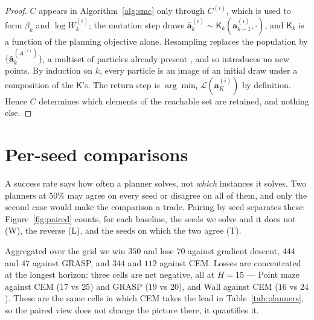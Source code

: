 \begin{proof}
$C$ appears in Algorithm~\ref{alg:smc} only through $C^{(i)}$, which is used to
form $\beta_k$ and $\log W_k^{(i)}$; the mutation step draws
$\bar{\mathbf{a}}_k^{(i)}\sim\mathsf{K}_k(\mathbf{a}_{k-1}^{(i)},\cdot)$, and
$\mathsf{K}_k$ is a function of the planning objective alone. Resampling
replaces the population by $\{\bar{\mathbf{a}}_k^{(A^{(i)})}\}$, a multiset of
particles already present , and so introduces no new
points. By induction on $k$, every particle is an image of an initial draw under
a composition of the $\mathsf{K}$'s. The return step is
$\arg\min_i\mathcal{L}(\mathbf{a}_K^{(i)})$ by definition. Hence $C$ determines
which elements of the reachable set are retained, and nothing else.
\end{proof}

\section{Per-seed comparisons}
\label{app:matched}

A success rate says how often a planner solves, not \emph{which} instances it
solves. Two planners at $50\%$ may agree on every seed or disagree on all of
them, and only the second case would make the comparison a trade. Pairing by
seed separates these: Figure~\ref{fig:paired} counts, for each baseline, the
seeds we solve and it does not (W), the reverse (L), and the seeds on which the
two agree (T).

Aggregated over the grid we win $350$ and lose $70$ against gradient descent,
$444$ and $47$ against GRASP, and $344$ and $112$ against CEM. Losses are
concentrated at the longest horizon: three cells are net negative, all at
$H{=}15$ --- Point maze against CEM ($17$ vs $25$) and GRASP ($19$ vs $20$), and
Wall against CEM ($16$ vs $24$). These are the same cells in which CEM takes the
lead in Table~\ref{tab:planners}, so the paired view does not change the
picture there, it quantifies it.

